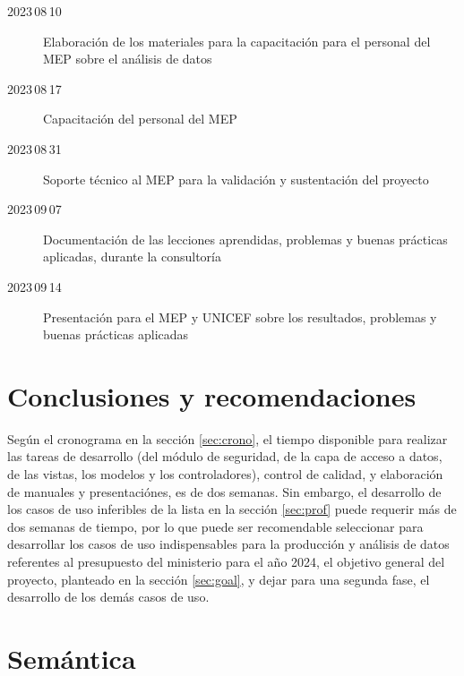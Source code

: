 \documentclass[a4paper, 9pt, conference]{article}              %
\theoremstyle{definition}
\begin{document}
\begin{tasks}[]
\begin{description}
		\item[2023\,08\,10] Elaboraci\'on de los materiales para la capacitaci\'on para el personal del MEP sobre el an\'alisis de datos
		\item[2023\,08\,17] Capacitaci\'on del personal del MEP
	\end{description}
	\task[]
	\begin{description}
		\item[2023\,08\,31] Soporte t\'ecnico al MEP para la validaci\'on y sustentaci\'on del proyecto
		\item[2023\,09\,07] Documentaci\'on de las lecciones aprendidas, problemas y buenas pr\'acticas aplicadas, durante la consultor\'ia
		\item[2023\,09\,14] Presentaci\'on para el MEP y UNICEF sobre los resultados, problemas y buenas pr\'acticas aplicadas
	\end{description}
\end{tasks}

\section{Conclusiones y recomendaciones}

Seg\'un el cronograma en la secci\'on \ref{sec:crono}, el tiempo disponible para realizar las tareas de desarrollo (del m\'odulo de seguridad, de la capa de acceso a datos, de las vistas, los modelos y los controladores), control de calidad, y elaboraci\'on de manuales y presentaci\'ones, es de dos semanas. Sin embargo, el desarrollo de los casos de uso inferibles de la lista en la secci\'on \ref{sec:prof} puede requerir m\'as de dos semanas de tiempo, por lo que puede ser recomendable seleccionar para desarrollar los casos de uso indispensables para la producci\'on y an\'alisis de datos referentes al presupuesto del ministerio para el a\~no 2024, el objetivo general del proyecto, planteado en la secci\'on \ref{sec:goal}, y dejar para una segunda fase, el desarrollo de los dem\'as casos de uso.




\section{Sem\'antica}
\end{document}
